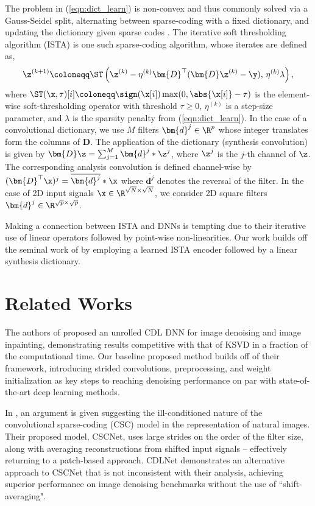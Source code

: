 \documentclass[conference]{IEEEtran}
\newcommand{\soa}{state-of-the-art }
\begin{document}
The problem in (\ref{eqn:dict_learn}) is non-convex and thus commonly solved via a Gauss-Seidel split, alternating between sparse-coding with a fixed dictionary, and updating the dictionary given sparse codes \cite{KSVD}. The iterative soft thresholding algorithm (ISTA) is one such sparse-coding algorithm, whose iterates are defined as,
\begin{equation} \label{eqn:ista}
\z^{(k+1)} \coloneqq \ST\left(\z^{(k)} - 
\eta^{(k)}\bm{D}^\top(\bm{D}\z^{(k)} - \y),\, \eta^{(k)}\lambda \right),
\end{equation}
where $\ST(\x,\tau)[i] \coloneqq \sign(\x[i])\max(0, \abs{\x[i]} - \tau)$ is the element-wise soft-thresholding operator with threshold $\tau \geq 0$, $\eta^{(k)}$ is a step-size parameter, and $\lambda$ is the sparsity penalty from (\ref{eqn:dict_learn}). In the case of a convolutional dictionary, we use $M$ filters $\bm{d}^j\in \R^{p}$ whose integer translates form the columns of $\bm{D}$. The application of the dictionary (synthesis convolution) is given by 
$\bm{D}\z = \sum_{j=1}^M \bm{d}^j \ast \z^j$, where $\z^j$ is the $j$-th channel of $\z$. 
The corresponding analysis convolution is defined channel-wise by $(\bm{D}^\top \x)^j = \overline{\bm{d}^j} \ast \x$ where $\overline{\bm{d}^j}$ denotes the reversal of the filter. In the case of 2D input signals $\x \in \R^{\sqrt{N}\times\sqrt{N}}$, we consider 2D square filters $\bm{d}^j \in \R^{\sqrt{p}\times\sqrt{p}}$. 

Making a connection between ISTA and DNNs is tempting due to their iterative use of linear operators followed by point-wise non-linearities. Our work builds off the seminal work of \cite{Gregor2010} by employing a learned ISTA encoder followed by a linear synthesis dictionary.

\section{Related Works}
The authors of \cite{Sreter2018} proposed an unrolled CDL DNN for image denoising and image inpainting, demonstrating results competitive with that of KSVD \cite{KSVD} in a fraction of the computational time. Our baseline proposed method builds off of their framework, introducing strided convolutions, preprocessing, and weight initialization as key steps to reaching denoising performance on par with \soa deep learning methods.

In \cite{Simon2019}, an argument is given suggesting the ill-conditioned nature of the convolutional sparse-coding (CSC) model in the representation of natural images. Their proposed model, CSCNet, uses large strides on the order of the filter size, along with averaging reconstructions from shifted input signals -- effectively returning to a patch-based approach. CDLNet demonstrates an alternative approach to CSCNet that is not inconsistent with their analysis, achieving superior performance on image denoising benchmarks without the use of ``shift-averaging".
\end{document}
